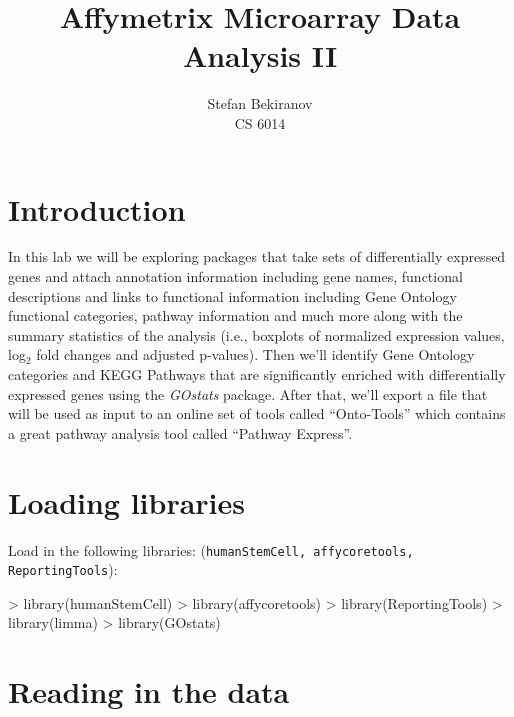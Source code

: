 \documentclass[12pt]{article}
\newcommand{\code}[1]{{\texttt{#1}}}
\begin{document}

\title{Affymetrix Microarray Data Analysis II}

\author{Stefan Bekiranov\\CS 6014}
\maketitle

\tableofcontents

\section{Introduction}

In this lab we will be exploring packages that take sets of differentially expressed genes and attach annotation information including gene names, functional descriptions and links to functional information including Gene Ontology functional categories, pathway information and much more along with the summary statistics of the analysis (i.e., boxplots of normalized expression values, log$_2$ fold changes and adjusted p-values).  Then we'll identify Gene Ontology categories and KEGG Pathways that are significantly enriched with differentially expressed genes using the {\it GOstats} package.  After that, we'll export a file that will be used as input to an online set of tools called ``Onto-Tools'' which contains a great pathway analysis tool called ``Pathway Express''.           

\section{Loading libraries}

Load in the following libraries: (\code{humanStemCell, affycoretools, ReportingTools}):
\begin{Schunk}
\begin{Sinput}
> library(humanStemCell)
> library(affycoretools)
> library(ReportingTools)
> library(limma)
> library(GOstats)
\end{Sinput}
\end{Schunk}

\section{Reading in the data}
\end{document}
